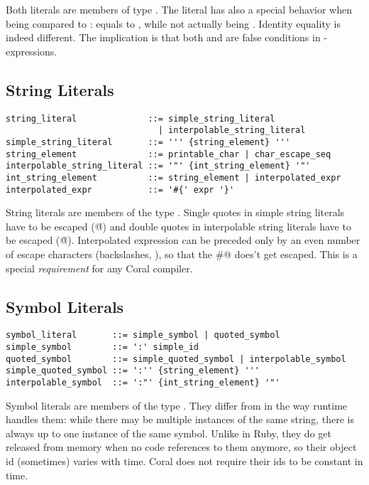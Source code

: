 Both literals are members of type \lstinline@Boolean@. The \lstinline@no@ literal has also a special behavior when being compared to \lstinline@nil@: \lstinline@no@ equals to \lstinline@nil@, while not actually being \lstinline@nil@. Identity equality is indeed different. The implication is that both \lstinline@nil@ and \lstinline@no@ are false conditions in \lstinline@if@-expressions. 

\subsection{String Literals}\label{sec:stringliterals}

\syntax\begin{lstlisting}
string_literal              ::= simple_string_literal 
                              | interpolable_string_literal
simple_string_literal       ::= ''' {string_element} '''
string_element              ::= printable_char | char_escape_seq
interpolable_string_literal ::= '"' {int_string_element} '"'
int_string_element          ::= string_element | interpolated_expr
interpolated_expr           ::= '#{' expr '}'
\end{lstlisting}

String literals are members of the type \lstinline@String@. Single quotes in simple string literals have to be escaped (\lstinline@\'@) and double quotes in interpolable string literals have to be escaped (\lstinline@\"@). Interpolated expression can be preceded only by an even number of escape characters (backslashes, \lstinline@\@), so that the \lstinline@#@ does't get escaped. This is a special \textit{requirement} for any Coral compiler. 

\subsection{Symbol Literals}\label{sec:symbolliterals}

\syntax\begin{lstlisting}
symbol_literal       ::= simple_symbol | quoted_symbol
simple_symbol        ::= ':' simple_id
quoted_symbol        ::= simple_quoted_symbol | interpolable_symbol
simple_quoted_symbol ::= ':'' {string_element} '''
interpolable_symbol  ::= ':"' {int_string_element} '"'
\end{lstlisting}

Symbol literals are members of the type \lstinline@Symbol@. They differ from  in the way runtime handles them: while there may be multiple instances of the same string, there is always up to one instance of the same symbol. Unlike in Ruby, they do get released from memory when no code references to them anymore, so their object id (sometimes) varies with time. Coral does not require their ids to be constant in time. 

